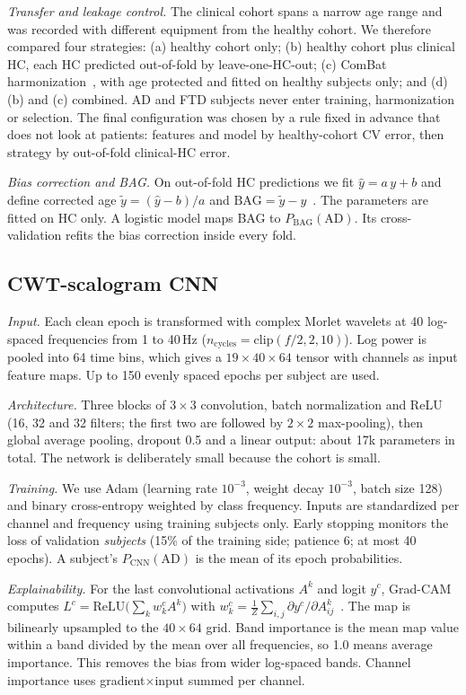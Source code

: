 \documentclass[journal]{IEEEtran}
\begin{document}
\emph{Transfer and leakage control.} The clinical cohort spans a narrow age range and was recorded with different equipment from the healthy cohort. We therefore compared four strategies: (a) healthy cohort only; (b) healthy cohort plus clinical HC, each HC predicted out-of-fold by leave-one-HC-out; (c) ComBat harmonization~\cite{johnson2007,fortin2018}, with age protected and fitted on healthy subjects only; and (d) (b) and (c) combined. AD and FTD subjects never enter training, harmonization or selection. The final configuration was chosen by a rule fixed in advance that does not look at patients: features and model by healthy-cohort CV error, then strategy by out-of-fold clinical-HC error.

\emph{Bias correction and BAG.} On out-of-fold HC predictions we fit $\hat{y}=a\,y+b$ and define corrected age $\tilde{y}=(\hat{y}-b)/a$ and $\mathrm{BAG}=\tilde{y}-y$~\cite{delange2020}. The parameters are fitted on HC only. A logistic model maps BAG to $P_\mathrm{BAG}(\mathrm{AD})$. Its cross-validation refits the bias correction inside every fold.

\subsection{CWT-scalogram CNN}
\emph{Input.} Each clean epoch is transformed with complex Morlet wavelets at 40 log-spaced frequencies from 1 to 40\,Hz ($n_\mathrm{cycles}=\mathrm{clip}(f/2,2,10)$). Log power is pooled into 64 time bins, which gives a $19\times40\times64$ tensor with channels as input feature maps. Up to 150 evenly spaced epochs per subject are used.

\emph{Architecture.} Three blocks of $3\times3$ convolution, batch normalization and ReLU (16, 32 and 32 filters; the first two are followed by $2\times2$ max-pooling), then global average pooling, dropout 0.5 and a linear output: about 17k parameters in total. The network is deliberately small because the cohort is small.

\emph{Training.} We use Adam (learning rate $10^{-3}$, weight decay $10^{-3}$, batch size 128) and binary cross-entropy weighted by class frequency. Inputs are standardized per channel and frequency using training subjects only. Early stopping monitors the loss of validation \emph{subjects} (15\% of the training side; patience 6; at most 40 epochs). A subject's $P_\mathrm{CNN}(\mathrm{AD})$ is the mean of its epoch probabilities.

\emph{Explainability.} For the last convolutional activations $A^k$ and logit $y^c$, Grad-CAM computes $L^c=\mathrm{ReLU}\big(\sum_k w_k^c A^k\big)$ with $w_k^c=\frac{1}{Z}\sum_{i,j}\partial y^c/\partial A^k_{ij}$~\cite{gradcam}. The map is bilinearly upsampled to the $40\times64$ grid. Band importance is the mean map value within a band divided by the mean over all frequencies, so 1.0 means average importance. This removes the bias from wider log-spaced bands. Channel importance uses gradient$\times$input summed per channel.
\end{document}
